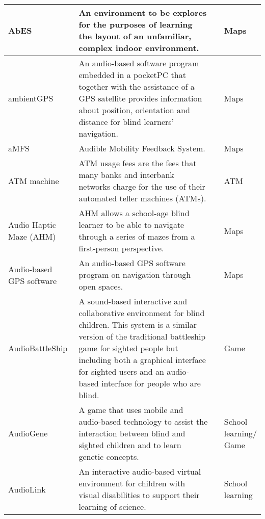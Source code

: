 \begin{small}
\begin{longtable}[h]{m{2.5cm}m{5cm}m{3cm}m{2cm}}
            AbES & An environment to be explores for the purposes of learning the layout of an unfamiliar, complex indoor environment. & {\tiny \cite{Connors2014,Connors2013,Sanchez2014,Jain2011}} & Maps \\ \hline
            
            ambientGPS & An audio-based software program embedded in a pocketPC that together with the assistance of a GPS satellite provides information about position, orientation and distance for blind learners’ navigation. & {\tiny \cite{Reads2009}} & Maps \\ \hline
            
            aMFS & Audible Mobility Feedback System. & {\tiny \cite{Adebiyi2017}} & Maps \\ \hline
            
            ATM machine & ATM usage fees are the fees that many banks and interbank networks charge for the use of their automated teller machines (ATMs). & {\tiny \cite{Shafiq2014}} & ATM \\ \hline
            
            Audio Haptic Maze (AHM) & AHM allows a school-age blind learner to be able to navigate through a series of mazes from a first-person perspective. & {\tiny \cite{ISI:000304018900033,Sanchez2013a,Sanchez2014Multimodal}} & Maps \\ \hline
            
            Audio-based GPS software & An audio-based GPS software program on navigation through open spaces. & {\tiny \cite{Sanchez2010autonomous}} & Maps \\ \hline
            
            AudioBattleShip & A sound-based interactive and collaborative environment for blind children. This system is a similar version of the traditional battleship game for sighted people but including both a graphical interface for sighted users and an audio-based interface for people who are blind. & {\tiny \cite{Sanchez2005b,Sanchez2004}} & Game \\ \hline
            
            AudioGene & A game that uses mobile and audio-based technology to assist the interaction between blind and sighted children and to learn genetic concepts. & {\tiny \cite{AudioGene}} & School learning$/$Game \\ \hline
            
            AudioLink & An interactive audio-based virtual environment for children with visual disabilities to support their learning of science. & {\tiny \cite{Sanchez2007science,Sanchez2009a}} & School learning \\ \hline
            

\end{longtable}
\end{small}
